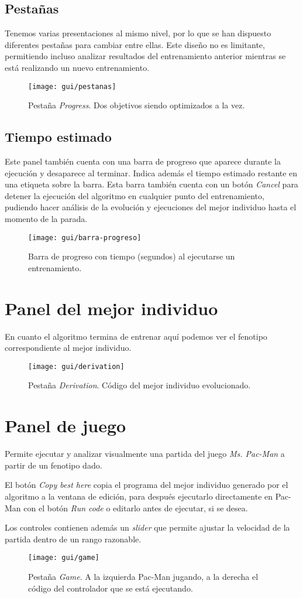 \subsection{Pestañas}
Tenemos varias presentaciones al mismo nivel, por lo que se han dispuesto diferentes pestañas para cambiar entre ellas. Este diseño no es limitante, permitiendo incluso analizar resultados del entrenamiento anterior mientras se está realizando un nuevo entrenamiento.
\begin{figure}[H]
\centering
\texttt{[image: gui/pestanas]}
\caption{Pestaña \textit{Progress}. Dos objetivos siendo optimizados a la vez.}
\end{figure}

\subsection{Tiempo estimado}
Este panel también cuenta con una barra de progreso que aparece durante la ejecución y desaparece al terminar. Indica además el tiempo estimado restante en una etiqueta sobre la barra. Esta barra también cuenta con un botón \textit{Cancel} para detener la ejecución del algoritmo en cualquier punto del entrenamiento, pudiendo hacer análisis de la evolución y ejecuciones del mejor individuo hasta el momento de la parada.
\begin{figure}[H]
\centering
\texttt{[image: gui/barra-progreso]}
\caption{Barra de progreso con tiempo (segundos) al ejecutarse un entrenamiento.}
\end{figure}

\section{Panel del mejor individuo}
En cuanto el algoritmo termina de entrenar aquí podemos ver el fenotipo correspondiente al mejor individuo.
\begin{figure}[H]
\centering
\texttt{[image: gui/derivation]}
\caption{Pestaña \textit{Derivation}. Código del mejor individuo evolucionado.}
\end{figure}

\section{Panel de juego}
Permite ejecutar y analizar visualmente una partida del juego \textit{Ms. Pac-Man} a partir de un fenotipo dado.

El botón \textit{Copy best here} copia el programa del mejor individuo generado por el algoritmo a la ventana de edición, para después ejecutarlo directamente en Pac-Man con el botón \textit{Run code} o editarlo antes de ejecutar, si se desea.

Los controles contienen además un \textit{slider} que permite ajustar la velocidad de la partida dentro de un rango razonable.
\begin{figure}[H]
\centering
\texttt{[image: gui/game]}
\caption{Pestaña \textit{Game}. A la izquierda Pac-Man jugando, a la derecha el código del controlador que se está ejecutando.}
\end{figure}

